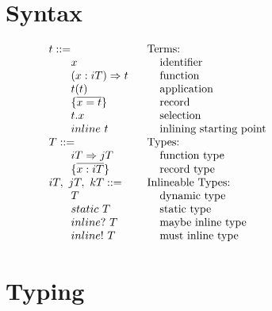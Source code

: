 
\section{Syntax}
\begin{figure}[H]
\begin{center}$
\begin{array}{l@{\hspace{0.2mm}}}
\begin{array}{l@{\hspace{10mm}}l}

  t ::=                     & \lindent{\mbox{Terms:}}            \\
  \gap x                    & \mbox{identifier}                  \\
  \gap (x: \i{T}) \ra t     & \mbox{function}                    \\
  \gap t(t)                 & \mbox{application}                 \\
  \gap \{ \seq{x = t} \}    & \mbox{record}                      \\
  \gap t.x                  & \mbox{selection}                   \\
  \gap \ct t                & \mbox{inlining starting point}     \\

  T ::=                     & \lindent{\mbox{Types:}}            \\
  \gap \i{T} \ra \j{T}      & \mbox{function type}               \\
  \gap \{ \seq{x: \i{T}} \} & \mbox{record type}                 \\

  \i{T},\ \j{T},\ \k{T} ::= & \lindent{\mbox{Inlineable Types:}} \\ 
  \gap T                    & \mbox{dynamic type}                \\
  \gap \static{T}           & \mbox{static type}                 \\
  \gap \mayInline{T}        & \mbox{maybe inline type}           \\
  \gap \inline{T}           & \mbox{must inline type}            \\

\end{array}
\end{array}
$\end{center}
\caption{}
\end{figure}

\section{Typing}

